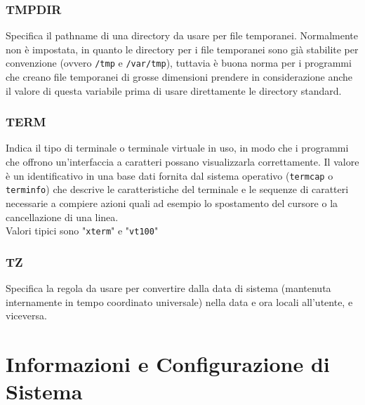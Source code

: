 \subsection{TMPDIR}
Specifica il pathname di una directory da usare per file temporanei. Normalmente non è impostata, in quanto le directory per i file temporanei sono già stabilite per convenzione (ovvero \verb*|/tmp| e \verb*|/var/tmp|), tuttavia è buona norma per i programmi che creano file temporanei di grosse dimensioni prendere in considerazione anche il valore di questa variabile prima di usare direttamente le directory standard.

\subsection{TERM}
Indica il tipo di terminale o terminale virtuale in uso, in modo che i programmi che offrono un'interfaccia a caratteri possano visualizzarla correttamente. Il valore è un identificativo in una base dati fornita dal sistema operativo (\verb*|termcap| o \verb*|terminfo|) che descrive le caratteristiche del terminale e le sequenze di caratteri necessarie a compiere azioni quali ad esempio lo spostamento del cursore o la cancellazione di una linea.\\
Valori tipici sono "\verb*|xterm|" e "\verb*|vt100|"

\subsection{TZ}
Specifica la regola da usare per convertire dalla data di sistema (mantenuta internamente in tempo coordinato universale) nella data e ora locali all'utente, e viceversa. 


\chapter{Informazioni e Configurazione di Sistema}

